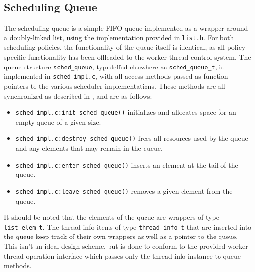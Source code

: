\documentclass[paper=a4, fontsize=11pt]{scrartcl}
\begin{document}
\subsection*{Scheduling Queue}
The scheduling queue is a simple FIFO queue implemented as a wrapper around a doubly-linked list, using the implementation provided in \texttt{list.h}. For both scheduling policies, the functionality of the queue itself is identical, as all policy-specific functionality has been offloaded to the worker-thread control system. The queue structure \texttt{sched\_queue}, typedeffed elsewhere as \texttt{sched\_queue\_t}, is implemented in \texttt{sched\_impl.c}, with all access methods passed as function pointers to the various scheduler implementations. These methods are all synchronized as described in \textbf{}, and are as follows:

\begin{itemize}
  \item \texttt{sched\_impl.c:init\_sched\_queue()} initializes and allocates space for an empty queue of a given size.
  \item \texttt{sched\_impl.c:destroy\_sched\_queue()} frees all resources used by the queue and any elements that may remain in the queue.
  \item \texttt{sched\_impl.c:enter\_sched\_queue()} inserts an element at the tail of the queue.
  \item \texttt{sched\_impl.c:leave\_sched\_queue()} removes a given element from the queue.
\end{itemize}

It should be noted that the elements of the queue are wrappers of type \texttt{list\_elem\_t}. The thread info items of type \texttt{thread\_info\_t} that are inserted into the queue keep track of their own wrappers as well as a pointer to the queue. This isn't an ideal design scheme, but is done to conform to the provided worker thread operation interface which passes only the thread info instance to queue methods.
\end{document}
